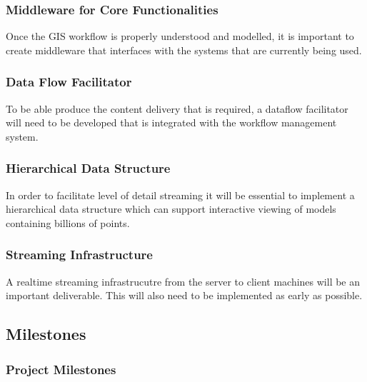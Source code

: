 \documentclass[12pt,a4paper]{article}
\begin{document}
\subsubsection*{Middleware for Core Functionalities}
Once the GIS workflow is properly understood and modelled, it is
important to create middleware that interfaces with the systems that are
currently being used.
\subsubsection*{Data Flow Facilitator}
To be able produce the content delivery that is required, a dataflow
facilitator will need to be developed that is integrated with the
workflow management system.
\subsubsection*{Hierarchical Data Structure}
In order to facilitate level of detail streaming it will be essential to
implement a hierarchical data structure which can support interactive
viewing of models containing billions of points.
\subsubsection*{Streaming Infrastructure}
A realtime streaming infrastrucutre from the server to client machines will be
an important deliverable. This will also need to be implemented as early as
possible.

\subsection{Milestones}
\subsubsection{Project Milestones}
\end{document}

